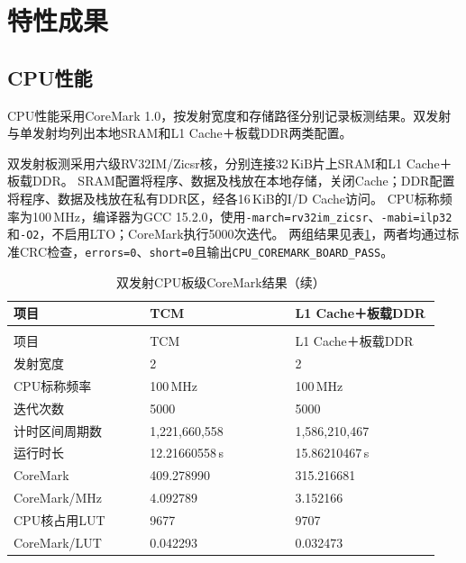\section{特性成果}

\subsection{CPU性能}

CPU性能采用CoreMark 1.0\cite{eembc-coremark-rules}，按发射宽度和存储路径分别记录板测结果。双发射与单发射均列出本地SRAM和L1 Cache＋板载DDR两类配置。

双发射板测采用六级RV32IM/Zicsr核，分别连接32\,KiB片上SRAM和L1 Cache＋板载DDR。
SRAM配置将程序、数据及栈放在本地存储，关闭Cache；DDR配置将程序、数据及栈放在私有DDR区，经各16\,KiB的I/D Cache访问。
CPU标称频率为100\,MHz，编译器为GCC 15.2.0，使用\texttt{-march=rv32im\_zicsr}、\texttt{-mabi=ilp32}和\texttt{-O2}，不启用LTO；CoreMark执行5000次迭代。
两组结果见表\ref{tbl:cpu-dual-coremark}，两者均通过标准CRC检查，\texttt{errors=0}、\texttt{short=0}且输出\texttt{CPU\_COREMARK\_BOARD\_PASS}。

\begin{reporttable}
\begin{longtable}{@{}p{0.30\linewidth}p{0.32\linewidth}p{0.32\linewidth}@{}}
\caption{双发射CPU板级CoreMark结果}\label{tbl:cpu-dual-coremark}\\
\toprule
项目 & TCM & L1 Cache＋板载DDR \\
\midrule
\endfirsthead
\caption[]{双发射CPU板级CoreMark结果（续）}\\
\toprule
项目 & TCM & L1 Cache＋板载DDR \\
\midrule
\endhead
\bottomrule
\endfoot
发射宽度 & 2 & 2 \\
CPU标称频率 & 100\,MHz & 100\,MHz \\
迭代次数 & 5000 & 5000 \\
计时区间周期数 & 1,221,660,558 & 1,586,210,467 \\
运行时长 & 12.21660558\,s & 15.86210467\,s \\
CoreMark & 409.278990 & 315.216681 \\
CoreMark/MHz & 4.092789 & 3.152166 \\
CPU核占用LUT & 9677 & 9707 \\
CoreMark/LUT & 0.042293 & 0.032473 \\
\end{longtable}
\end{reporttable}

